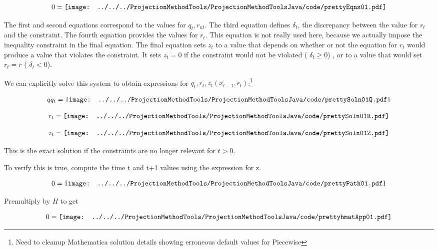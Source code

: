 \documentclass[12pt]{article}
\begin{document}
\begin{gather*}
  0=\vcenter{\hbox{\texttt{[image: ../../../ProjectionMethodTools/ProjectionMethodToolsJava/code/prettyEqns01.pdf]}}}
\end{gather*}

The first and second equations correspond to the values for $q_t,r_{ut}$.
The third equation defines $\delta_t$, the discrepancy between the value for $r_t$ and the constraint.    The fourth equation provides the values for $r_t$.  This equation is not really used here, because we actually impose the inequality
constraint in the final equation. The final equation
 sets $z_t$ to a value that depends on 
whether or not the equation for $r_t$ would produce a value that violates the
constraint.  It sets $z_t=0$ if the constraint would  not be violated ( $\delta_t\ge0$) ,  or
to a value that would set $r_t=\bar{r}$ ( $\delta_t<0$).


We can explicitly solve this system to obtain  expressions for $q_t, r_t, z_{t}(x_{t-1},\epsilon_t) $:\footnote{Need to cleanup Mathematica solution details showing erroneous default values for Piecewise}

\begin{gather*}
  qq_t=\vcenter{\hbox{\texttt{[image: ../../../ProjectionMethodTools/ProjectionMethodToolsJava/code/prettySoln01Q.pdf]}}}
\end{gather*}

\begin{gather*}
  r_t=\vcenter{\hbox{\texttt{[image: ../../../ProjectionMethodTools/ProjectionMethodToolsJava/code/prettySoln01R.pdf]}}}
\end{gather*}

\begin{gather*}
  z_t=\vcenter{\hbox{\texttt{[image: ../../../ProjectionMethodTools/ProjectionMethodToolsJava/code/prettySoln01Z.pdf]}}}
\end{gather*}

This is the exact solution if the constraints are no longer relevant for 
$t >0$.

To verify this is true, compute the time t and t+1 values using the expression for z.

\begin{gather*}
  0=\vcenter{\hbox{\texttt{[image: ../../../ProjectionMethodTools/ProjectionMethodToolsJava/code/prettyPath01.pdf]}}}
\end{gather*}

Premultiply by $H$ to get

\begin{gather*}
  0=\vcenter{\hbox{\texttt{[image: ../../../ProjectionMethodTools/ProjectionMethodToolsJava/code/prettyhmatApp01.pdf]}}}
\end{gather*}
\end{document}
